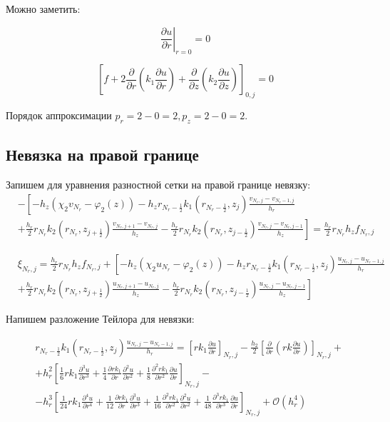 Можно заметить:

\[
  \left. \frac{\partial u}{\partial r} \right|_{r=0} = 0
\]

\[
  \left[ f 
  + 2\frac{\partial }{ \partial r} \left( k_1 \frac{\partial u}{ \partial r} \right)
  + \frac{\partial }{ \partial z} \left( k_2 \frac{\partial u}{ \partial z} \right)
 \right]_{0, j} = 0
\]

Порядок аппроксимации $ p_r = 2 - 0 = 2, p_z = 2 - 0 = 2 $.

\subsection{Невязка на правой границе}

Запишем для уравнения разностной сетки на правой границе невязку:
\begin{align*}
  &- \left [ 
  -h_z ( \chi_2 v_{N_r} - \varphi_2(z))
  - h_z r_{N_r-\frac{1}{2}} k_1(r_{N_r-\frac{1}{2}}, z_j) \frac{v_{N_r, j} - v_{N_r - 1, j}}{h_{r}}
  \right . \\
  &\left .
  + \frac{h_r}{2} r_{N_r} k_2(r_{N_r}, z_{j+\frac{1}{2}}) \frac{v_{N_r, j + 1} - v_{N_r, j}}{h_{z}}
  - \frac{h_r}{2} r_{N_r} k_2(r_{N_r}, z_{j-\frac{1}{2}}) \frac{v_{N_r, j} - v_{N_r, j - 1}}{h_z}
  \right ]  = \frac{h_r}{2} r_{N_r} h_z f_{N_r, j}
\end{align*}

\begin{align*}
  &\xi_{N_r, j} = \frac{h_r}{2} r_{N_r} h_z f_{N_r, j} + \left [ 
    -h_z ( \chi_2 u_{N_r} - \varphi_2(z))
    - h_z r_{N_r-\frac{1}{2}} k_1(r_{N_r-\frac{1}{2}}, z_j) \frac{u_{N_r, j} - u_{N_r - 1, j}}{h_{r}}
    \right . \\
  &\left .
  + \frac{h_r}{2} r_{N_r} k_2(r_{N_r}, z_{j+\frac{1}{2}}) \frac{u_{N_r, j + 1} - u_{N_r, j}}{h_{z}}
    - \frac{h_r}{2} r_{N_r} k_2(r_{N_r}, z_{j-\frac{1}{2}}) \frac{u_{N_r, j} - u_{N_r, j - 1}}{h_z}
    \right ]
\end{align*}

Напишем разложение Тейлора для невязки:

\begin{align*}
  &r_{N_r-\frac{1}{2}} k_1(r_{N_r-\frac{1}{2}}, z_j) \frac{u_{N_r, j} - u_{N_r - 1, j}}{h_{r}} =
  \left[ rk_1 \frac{\partial u}{\partial r} \right]_{N_r, j}
  - \frac{h_2}{2} \left[ \frac{\partial }{\partial r} \left( rk \frac{\partial u}{\partial r} \right) \right]_{N_r, j} + \\
  & + h^2_r \left[
    \frac{1}{6} rk_1 \frac{\partial^3 u}{\partial r^3} +
    \frac{1}{4} \frac{\partial rk_1}{\partial r} \frac{\partial^2 u}{\partial r^2} +
    \frac{1}{8} \frac{\partial^2 rk_1}{\partial r^2} \frac{\partial u}{\partial r}
   \right]_{N_r, j} -\\
  &- h^3_r \left[ 
    \frac{1}{24} rk_1 \frac{\partial^4 u}{\partial r^4} +
    \frac{1}{12} \frac{\partial rk_1}{\partial r} \frac{\partial^3 u}{\partial r^3} +
    \frac{1}{16} \frac{\partial^2 rk_1}{\partial r^2} \frac{\partial^2 u}{\partial r^2} +
    \frac{1}{48} \frac{\partial^3 rk_1}{\partial r^3} \frac{\partial u}{\partial r}
  \right]_{N_r, j} + \mathcal{O}(h^4_r)
\end{align*}

